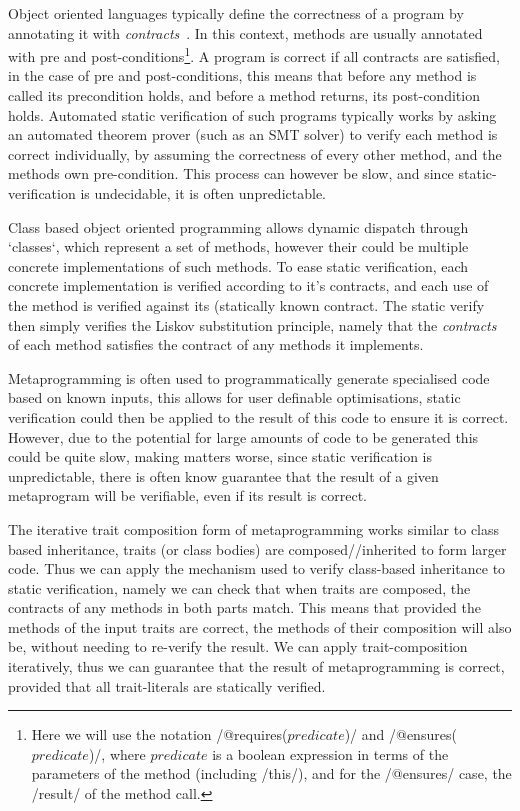 Object oriented languages typically define the correctness of a program by annotating it with \emph{contracts}~\cite{Meyer:1988:OSC:534929}. In this context, methods are usually annotated with pre and post-conditions\footnote{Here we will use the notation /@requires($predicate$)/ and /@ensures($predicate$)/, where $predicate$ is a boolean expression in terms of the parameters of the method (including /this/), and for the /@ensures/ case, the /result/ of the method call.}. A program is correct if all contracts are satisfied, in the case of pre and post-conditions, this means that before any method is called its precondition holds, and before a method returns, its post-condition holds. Automated static verification of such programs typically works by asking an automated theorem prover (such as an SMT solver) to verify each method is correct individually, by assuming the correctness of every other method, and the methods own pre-condition. This process can however be slow, and since static-verification is undecidable, it is often unpredictable.


Class based object oriented programming allows dynamic dispatch through `classes`, which represent a set of methods, however their could be multiple concrete implementations of such methods. To ease static verification, each concrete implementation is verified according to it's contracts, and each use of the method is verified against its (statically known contract. The static verify then simply verifies the Liskov substitution principle, namely that the \emph{contracts} of each method satisfies the contract of any methods it implements.

Metaprogramming is often used to programmatically generate specialised code based on known inputs, this allows for user definable optimisations, static verification could then be applied to the result of this code to ensure it is correct. However, due to the potential for large amounts of code to be generated this could be quite slow, making matters worse, since static verification is unpredictable, there is often know guarantee that the result of a given metaprogram will be verifiable, even if its result is correct.


The iterative trait composition form of metaprogramming works similar to class based inheritance, traits (or class bodies) are composed//inherited to form larger code. Thus we can apply the mechanism used to verify class-based inheritance to static verification, namely we can check that when traits are composed, the contracts of any methods in both parts match. This means that provided the methods of the input traits are correct, the methods of their composition will also be, without needing to re-verify the result. We can apply trait-composition iteratively, thus we can guarantee that the result of metaprogramming is correct, provided that all trait-literals are statically verified.

